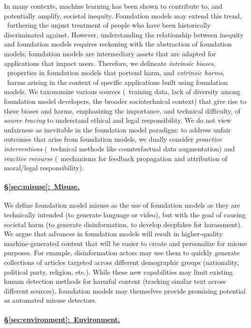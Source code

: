 In many contexts, machine learning has been shown to contribute to, and potentially amplify, societal inequity.
Foundation models may extend this trend, \ie~furthering the unjust treatment of people who have been historically discriminated against.
However, understanding the relationship between inequity and foundation models requires reckoning with the abstraction of foundation models; foundation models are intermediary assets that are adapted for applications that impact users.
Therefore, we delineate \textit{intrinsic biases}, \ie~properties in foundation models that portend harm, and \textit{extrinsic harms}, \ie~harms arising in the context of specific applications built using foundation models.
We taxonomize various sources (\eg~training data, lack of diversity among foundation model developers, the broader sociotechnical context) that give rise to these biases and harms, emphasizing the importance, and technical difficulty, of \textit{source tracing} to understand ethical and legal responsibility.
We do not view unfairness as inevitable in the foundation model paradigm: to address unfair outcomes that arise from foundation models, we dually consider \textit{proactive interventions} (\eg~technical methods like counterfactual data augmentation) and \textit{reactive recourse} (\eg~mechanisms for feedback propagation and attribution of moral/legal responsibility). 

\paragraph{\hyperref[sec:misuse]{§\ref{sec:misuse}:~Misuse.}}

We define foundation model misuse as the use of foundation models as they are technically intended (\eg to generate language or video), but with the goal of causing societal harm (\eg to generate disinformation, to develop deepfakes for harassment). 
We argue that advances in foundation models will result in higher-quality machine-generated content that will be easier to create and personalize for misuse purposes. 
For example, disinformation actors may use them to quickly generate collections of articles targeted across different demographic groups (\eg nationality, political party, religion, etc.). 
While these new capabilities may limit existing human detection methods for harmful content (\eg tracking similar text across different sources), foundation models may themselves provide promising potential as automated misuse detectors.

\paragraph{\hyperref[sec:environment]{§\ref{sec:environment}:~Environment.}}

